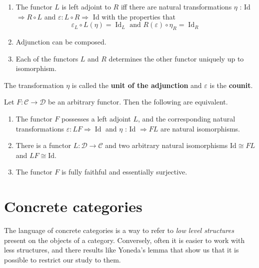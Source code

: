 \begin{prop}
    \begin{enumerate}
      \item The functor $L$ is left adjoint to $R$ iff there are natural transformations $\eta$ : Id $\Rightarrow R \circ L$ and $\varepsilon: L \circ R \Rightarrow$ Id with the properties that
      $$
      \varepsilon_L \circ L(\eta)=\operatorname{Id}_L \text { and } R(\varepsilon) \circ \eta_R=\operatorname{Id}_R
      $$
      \item Adjunction can be composed.
      \item Each of the functors $L$ and $R$ determines the other functor uniquely up to isomorphism.
      
    \end{enumerate}
\end{prop}
The transformation $\eta$ is called the \textbf{unit of the adjunction} and $\varepsilon$ is the \textbf{counit}.


\begin{theo}
Let $F: \mathcal{C} \rightarrow \mathcal{D}$ be an arbitrary functor. Then the following are equivalent.
\begin{enumerate}
    \item The functor $F$ possesses a left adjoint $L$, and the corresponding natural transformations $\varepsilon: L F \Rightarrow \operatorname{Id}$ and $\eta$ : Id $\Rightarrow F L$ are natural isomorphisms.
    \item There is a functor $L: \mathcal{D} \rightarrow \mathcal{C}$ and two arbitrary natural isomorphisms $\mathrm{Id} \cong F L$ and $L F \cong \mathrm{Id}$.
    \item The functor $F$ is fully faithful and essentially surjective.
\end{enumerate}
\end{theo}




\section{Concrete categories} %

The language of concrete categories is a way to refer to \textit{low level structures} present on the objects of a category. Conversely, often it is easier to work with less structures, and there results like Yoneda's lemma that show us that it is possible to restrict our study to them.\\

